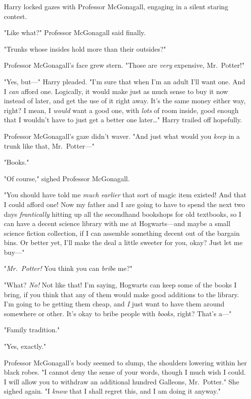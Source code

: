 Harry locked gazes with Professor McGonagall, engaging in a silent staring
contest.

"Like what?" Professor McGonagall said finally.

"Trunks whose insides hold more than their outsides?"

Professor McGonagall's face grew stern. "Those are \emph{very} expensive,
Mr.~Potter!"

"Yes, but---" Harry pleaded. "I'm sure that when I'm an adult I'll want one.
And I \emph{can} afford one. Logically, it would make just as much sense to buy
it now instead of later, and get the use of it right away. It's the same money
either way, right? I mean, I \emph{would} want a good one, with \emph{lots} of
room inside, good enough that I wouldn't have to just get a better one
later{\ldots}" Harry trailed off hopefully.

Professor McGonagall's gaze didn't waver. "And just what would you \emph{keep}
in a trunk like that, Mr.~Potter---"

"Books."

"Of course," sighed Professor McGonagall.

"You should have told me \emph{much earlier} that sort of magic item existed!
And that I could afford one! Now my father and I are going to have to spend the
next two days \emph{frantically} hitting up all the secondhand bookshops for
old textbooks, so I can have a decent science library with me at Hogwarts---and
maybe a small science fiction collection, if I can assemble something decent
out of the bargain bins. Or better yet, I'll make the deal a little sweeter for
you, okay? Just let me buy---"

"\emph{Mr.~Potter!} You think you can \emph{bribe} me?"

"What? \emph{No!} Not like that! I'm saying, Hogwarts can keep some of the
books I bring, if you think that any of them would make good additions to the
library. I'm going to be getting them cheap, and \emph{I} just want to have
them around somewhere or other. It's okay to bribe people with \emph{books,}
right? That's a---"

"Family tradition."

"Yes, exactly."

Professor McGonagall's body seemed to slump, the shoulders lowering within her
black robes. "I cannot deny the sense of your words, though I much wish I
could. I will allow you to withdraw an additional hundred Galleons,
Mr.~Potter." She sighed again. "I \emph{know} that I shall regret this, and I
am doing it anyway."

